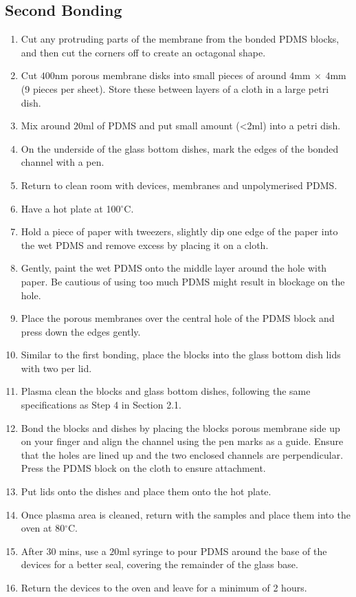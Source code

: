 \subsection{Second Bonding}

\begin{enumerate}
 \setlength\itemsep{-0.1em}
	\item Cut any protruding parts of the membrane from the bonded PDMS blocks, and then cut the corners off to create an octagonal shape.
	\item Cut $400  \text{nm}$ porous membrane disks into small pieces of around $4  \text{mm} \: \times \: 4  \text{mm}$ (9 pieces per sheet). Store these between layers of a cloth in a large petri dish.
	\item Mix around $20  \text{ml}$ of PDMS and put small amount (<2ml) into a petri dish.
	\item On the underside of the glass bottom dishes, mark the edges of the bonded channel with a pen.
	\item Return to clean room with devices, membranes and unpolymerised PDMS.
	\item Have a hot plate at 100$^{\circ}$C.
	\item Hold a piece of paper with tweezers, slightly dip one edge of the paper into the wet PDMS and remove excess by placing it on a cloth. 
	\item Gently, paint the wet PDMS onto the middle layer around the hole with paper. Be cautious of using too much PDMS might result in blockage on the hole.
	\item Place the porous membranes over the central hole of the PDMS block and press down the edges gently. 
	\item Similar to the first bonding, place the blocks into the glass bottom dish lids with two per lid. 
	\item Plasma clean the blocks and glass bottom dishes, following the same specifications as Step 4 in Section 2.1.
	\item Bond the blocks and dishes by placing the blocks porous membrane side up on your finger and align the channel using the pen marks as a guide. Ensure that the holes are lined up and the two enclosed channels are perpendicular. Press the PDMS block on the cloth to ensure attachment. 
	\item Put lids onto the dishes and place them onto the hot plate.
	\item Once plasma area is cleaned, return with the samples and place them into the oven at 80$^{\circ}$C. 
	\item After 30 mins, use a $20  \text{ml}$ syringe to pour PDMS around the base of the devices for a better seal, covering the remainder of the glass base.
	\item Return the devices to the oven and leave for a minimum of 2 hours.
\end{enumerate}

